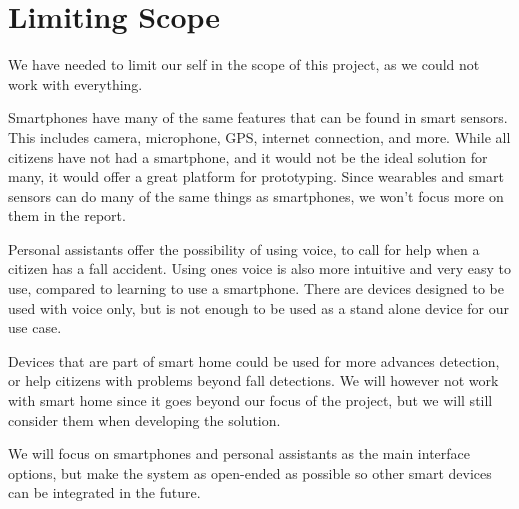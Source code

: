\section{Limiting Scope}
We have needed to limit our self in the scope of this project, as we could not work with everything.

Smartphones have many of the same features that can be found in smart sensors. This includes camera, microphone, GPS, internet connection, and more. While all citizens have not had a smartphone, and it would not be the ideal solution for many, it would offer a great platform for prototyping.
Since wearables and smart sensors can do many of the same things as smartphones, we won't focus more on them in the report.

Personal assistants offer the possibility of using voice, to call for help when a citizen has a fall accident. Using ones voice is also more intuitive and very easy to use, compared to learning to use a smartphone. There are devices designed to be used with voice only, but is not enough to be used as a stand alone device for our use case.

Devices that are part of smart home could be used for more advances detection, or help citizens with problems beyond fall detections. We will however not work with smart home since it goes beyond our focus of the project, but we will still consider them when developing the solution.

We will focus on smartphones and personal assistants as the main interface options, but make the system as open-ended as possible so other smart devices can be integrated in the future.
